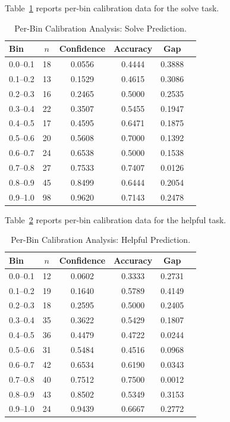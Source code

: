 \documentclass[12pt]{article}
\begin{document}
Table~\ref{tab:calibration_bins_solve} reports per-bin calibration data for the solve task.

\begin{table}[H]
\centering
\caption{Per-Bin Calibration Analysis: Solve Prediction.}
\label{tab:calibration_bins_solve}
\begin{tabular}{lccccc}
\toprule
\textbf{Bin} & \textbf{$n$} & \textbf{Confidence} & \textbf{Accuracy} & \textbf{Gap} \\
\midrule
0.0--0.1 & 18  & 0.0556 & 0.4444 & 0.3888 \\
0.1--0.2 & 13  & 0.1529 & 0.4615 & 0.3086 \\
0.2--0.3 & 16  & 0.2465 & 0.5000 & 0.2535 \\
0.3--0.4 & 22  & 0.3507 & 0.5455 & 0.1947 \\
0.4--0.5 & 17  & 0.4595 & 0.6471 & 0.1875 \\
0.5--0.6 & 20  & 0.5608 & 0.7000 & 0.1392 \\
0.6--0.7 & 24  & 0.6538 & 0.5000 & 0.1538 \\
0.7--0.8 & 27  & 0.7533 & 0.7407 & 0.0126 \\
0.8--0.9 & 45  & 0.8499 & 0.6444 & 0.2054 \\
0.9--1.0 & 98  & 0.9620 & 0.7143 & 0.2478 \\
\bottomrule
\end{tabular}
\end{table}

Table~\ref{tab:calibration_bins_helpful} reports per-bin calibration data for the helpful task.

\begin{table}[H]
\centering
\caption{Per-Bin Calibration Analysis: Helpful Prediction.}
\label{tab:calibration_bins_helpful}
\begin{tabular}{lccccc}
\toprule
\textbf{Bin} & \textbf{$n$} & \textbf{Confidence} & \textbf{Accuracy} & \textbf{Gap} \\
\midrule
0.0--0.1 & 12  & 0.0602 & 0.3333 & 0.2731 \\
0.1--0.2 & 19  & 0.1640 & 0.5789 & 0.4149 \\
0.2--0.3 & 18  & 0.2595 & 0.5000 & 0.2405 \\
0.3--0.4 & 35  & 0.3622 & 0.5429 & 0.1807 \\
0.4--0.5 & 36  & 0.4479 & 0.4722 & 0.0244 \\
0.5--0.6 & 31  & 0.5484 & 0.4516 & 0.0968 \\
0.6--0.7 & 42  & 0.6534 & 0.6190 & 0.0343 \\
0.7--0.8 & 40  & 0.7512 & 0.7500 & 0.0012 \\
0.8--0.9 & 43  & 0.8502 & 0.5349 & 0.3153 \\
0.9--1.0 & 24  & 0.9439 & 0.6667 & 0.2772 \\
\bottomrule
\end{tabular}
\end{table}
\end{document}
